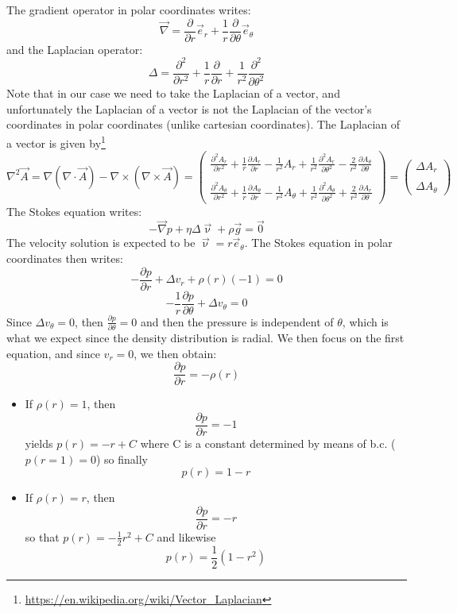 The gradient operator in polar coordinates writes:
\[
{\vec \nabla} = \frac{\partial }{\partial r} {\vec e}_r 
+ \frac{1}{r} \frac{\partial }{\partial \theta} {\vec e}_\theta 
\]
and the Laplacian operator:
\[
\Delta = \frac{\partial^2}{\partial r^2} + \frac{1}{r} \frac{\partial }{\partial r} + \frac{1}{r^2} \frac{\partial^2 }{\partial \theta^2}
\]
Note that in our case we need to take the Laplacian of a vector, and unfortunately the Laplacian of a vector is not the Laplacian 
of the vector's coordinates in polar coordinates (unlike cartesian coordinates). 
The Laplacian of a vector is given by\footnote{\url{https://en.wikipedia.org/wiki/Vector\_Laplacian}} 
\[
\nabla^2 \vec{A} = \nabla(\nabla\cdot\vec{A}) - \nabla\times(\nabla \times\vec{A})
=
\left(
\begin{array}{l}
\frac{\partial^2 A_r}{\partial r^2} + \frac{1}{r} \frac{\partial A_r}{\partial r} - \frac{1}{r^2} A_r  + \frac{1}{r^2} \frac{\partial^2 A_r}{\partial \theta^2}  - \frac{2}{r^2} \frac{\partial A_\theta}{\partial \theta} \\ \\
\frac{\partial^2 A_\theta}{\partial r^2} + \frac{1}{r} \frac{\partial A_\theta}{\partial r} - \frac{1}{r^2} A_\theta  + \frac{1}{r^2} \frac{\partial^2 A_\theta}{\partial \theta^2}  + \frac{2}{r^2} \frac{\partial A_r}{\partial \theta} 
\end{array}
\right)
=
\left(
\begin{array}{l}
\Delta A_r \\ \\ \Delta A_\theta
\end{array}
\right)
\]
The Stokes equation writes:
\[
-\vec\nabla p + \eta \Delta {\vec \upnu} + \rho {\vec g} = {\vec 0}
\]
The velocity solution is expected to be ${\vec \upnu}= r {\vec e}_\theta $.
The Stokes equation in polar coordinates then writes:
\[
-\frac{\partial p}{\partial r} + \Delta v_r + \rho(r) (- 1)  = 0 
\]
\[
-\frac{1}{r}\frac{\partial p}{\partial \theta} + \Delta v_\theta = 0
\]
Since $\Delta v_\theta = 0$, then $\frac{\partial p}{\partial \theta}=0$ and then the pressure is independent of $\theta$, 
which is what we expect since the density distribution is radial. 
We then focus on the first equation, and since $v_r=0$, we then obtain:
\[
\frac{\partial p}{\partial r}  = - \rho(r)
\]

\begin{itemize}
\item If $\rho(r)=1$, then 
\[
\frac{\partial p}{\partial r}  = - 1
\]
yields $p(r)=-r+C$ where C is a constant determined by means of b.c. ($p(r=1)=0$) so finally
\[
\boxed{
p(r)=1-r
}
\]

\item If $\rho(r)=r$, then 
\[
\frac{\partial p}{\partial r}  = - r
\]
so that $p(r)=-\frac{1}{2}r^2 + C$ and likewise
\[
\boxed{
p(r)=\frac{1}{2} (1- r^2)
}
\]
\end{itemize}
  
